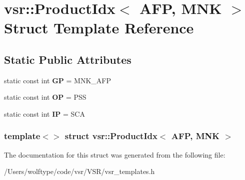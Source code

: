 \hypertarget{structvsr_1_1_product_idx_3_01_a_f_p_00_01_m_n_k_01_4}{\section{vsr\-:\-:Product\-Idx$<$ A\-F\-P, M\-N\-K $>$ Struct Template Reference}
\label{structvsr_1_1_product_idx_3_01_a_f_p_00_01_m_n_k_01_4}
}
\subsection*{Static Public Attributes}
\begin{DoxyCompactItemize}
\item 
\hypertarget{structvsr_1_1_product_idx_3_01_a_f_p_00_01_m_n_k_01_4_a5d4903a2551335abb112e4ce869f13e3}{static const int {\bfseries G\-P} = M\-N\-K\-\_\-\-A\-F\-P}\label{structvsr_1_1_product_idx_3_01_a_f_p_00_01_m_n_k_01_4_a5d4903a2551335abb112e4ce869f13e3}

\item 
\hypertarget{structvsr_1_1_product_idx_3_01_a_f_p_00_01_m_n_k_01_4_a4ba368de91ff5e28f1ac3fb736ca6e74}{static const int {\bfseries O\-P} = P\-S\-S}\label{structvsr_1_1_product_idx_3_01_a_f_p_00_01_m_n_k_01_4_a4ba368de91ff5e28f1ac3fb736ca6e74}

\item 
\hypertarget{structvsr_1_1_product_idx_3_01_a_f_p_00_01_m_n_k_01_4_ac7f6b0fce3bab4733aadf69c5740d9d6}{static const int {\bfseries I\-P} = S\-C\-A}\label{structvsr_1_1_product_idx_3_01_a_f_p_00_01_m_n_k_01_4_ac7f6b0fce3bab4733aadf69c5740d9d6}

\end{DoxyCompactItemize}
\subsubsection*{template$<$$>$ struct vsr\-::\-Product\-Idx$<$ A\-F\-P, M\-N\-K $>$}



The documentation for this struct was generated from the following file\-:\begin{DoxyCompactItemize}
\item 
/\-Users/wolftype/code/vsr/\-V\-S\-R/vsr\-\_\-templates.\-h\end{DoxyCompactItemize}
